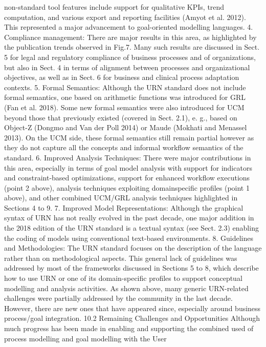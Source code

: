 non-standard tool features include support for
qualitative KPIs, trend computation, and various export and reporting facilities (Amyot et al.
2012). This represented a major advancement
to goal-oriented modelling languages.
4. Compliance management: There are major
results in this area, as highlighted by the publication trends observed in Fig.7. Many such
results are discussed in Sect. 5 for legal and
regulatory compliance of business processes
and of organizations, but also in Sect. 4 in
terms of alignment between processes and organizational objectives, as well as in Sect. 6
for business and clinical process adaptation
contexts.
5. Formal Semantics: Although the URN standard does not include formal semantics, one
based on arithmetic functions was introduced
for GRL (Fan et al. 2018). Some new formal
semantics were also introduced for UCM beyond those that previously existed (covered in
Sect. 2.1), e. g., based on Object-Z (Dongmo
and Van der Poll 2014) or Maude (Mokhati
and Menassel 2013). On the UCM side, these
formal semantics still remain partial however
as they do not capture all the concepts and
informal workflow semantics of the standard.
6. Improved Analysis Techniques: There were major contributions in this area, especially in terms
of goal model analysis with support for indicators and constraint-based optimizations, support for enhanced workflow executions (point 2
above), analysis techniques exploiting domainspecific profiles (point 1 above), and other
combined UCM/GRL analysis techniques highlighted in Sections 4 to 9.
7. Improved Model Representations: Although
the graphical syntax of URN has not really
evolved in the past decade, one major addition
in the 2018 edition of the URN standard is
a textual syntax (see Sect. 2.3) enabling the
coding of models using conventional text-based
environments.
8. Guidelines and Methodologies: The URN standard focuses on the description of the language
rather than on methodological aspects. This
general lack of guidelines was addressed by
most of the frameworks discussed in Sections 5
to 8, which describe how to use URN or one of
its domain-specific profiles to support conceptual modelling and analysis activities.
As shown above, many generic URN-related
challenges were partially addressed by the community in the last decade. However, there are new
ones that have appeared since, especially around
business process/goal integration.
10.2 Remaining Challenges and
Opportunities
Although much progress has been made in enabling and supporting the combined used of process modelling and goal modelling with the User
